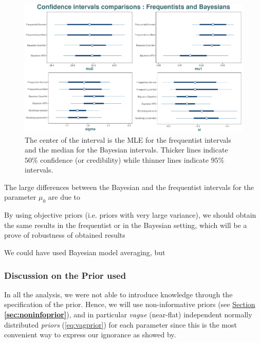 \begin{figure}[!htb]
	\centering	\includegraphics[width=0.9\linewidth]{cicomp.pdf}\caption{The center of the interval is the MLE for the frequentist intervals and the median for the Bayesian intervals. Thicker lines indicate $50\%$ confidence (or credibility) while thinner lines indicate $95\%$ intervals.}\label{fig:cicomp}
\end{figure}

The large differences between the Bayesian and the frequentist intervals for the parameter $\mu_0$ are due to 


By using objective priors (i.e. priors with very large variance), we should obtain the same results in the frequentist or in the Bayesian setting, which will be a prove of robustness of obtained results  

We could have used Bayesian model averaging, but


\subsubsection*{Discussion on the Prior used}

In all the analysis, we were not able to introduce knowledge through the specification of the prior. Hence, we will use non-informative priors (see \hyperref[sec:noninfoprior]{Section \textbf{\ref{sec:noninfoprior}}}), and in particular \emph{vague} (near-flat) independent normally distributed \emph{priors} (\ref{eq:vagprior}) for each parameter since this is the most convenient way to express our ignorance as showed by.


